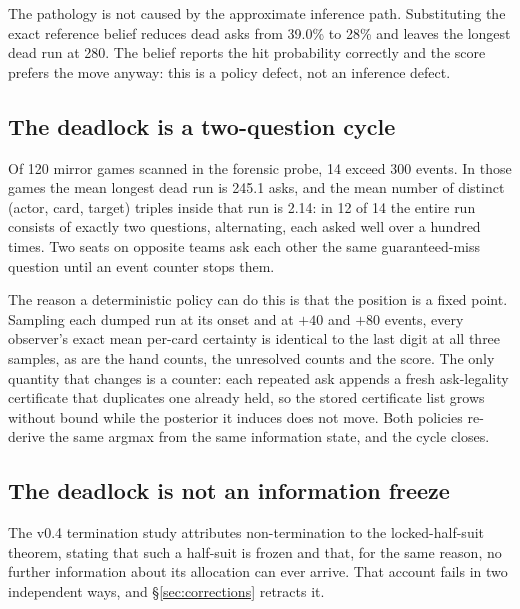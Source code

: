 \documentclass[11pt]{article}
\theoremstyle{definition}
\providecommand{\numDeadAsk}{39.0}
\providecommand{\numBlockDeadAsk}{28}
\providecommand{\numBlockDeadRun}{280}
\providecommand{\numScanGames}{120}
\providecommand{\numLongGames}{14}
\providecommand{\numCycleLen}{245.1}
\providecommand{\numCycleTriples}{2.14}
\providecommand{\numPureCycle}{12}
\begin{document}
The pathology is not caused by the approximate inference path. Substituting the
exact reference belief reduces dead asks from \numDeadAsk\% to
\numBlockDeadAsk\% and leaves the longest dead run at \numBlockDeadRun{}. The
belief reports the hit probability correctly and the score prefers the move
anyway: this is a policy defect, not an inference defect.

\subsection{The deadlock is a two-question cycle}
\label{sec:diag-cycle}

Of \numScanGames{} mirror games scanned in the forensic probe, \numLongGames{}
exceed 300 events. In those games the mean longest dead run is \numCycleLen{}
asks, and the mean number of distinct (actor, card, target) triples inside that
run is \numCycleTriples{}: in \numPureCycle{} of \numLongGames{} the entire run
consists of exactly two questions, alternating, each asked well over a hundred
times. Two seats on opposite teams ask each other the same guaranteed-miss
question until an event counter stops them.

The reason a deterministic policy can do this is that the position is a fixed
point. Sampling each dumped run at its onset and at $+40$ and $+80$ events, every
observer's exact mean per-card certainty is identical to the last digit at all
three samples, as are the hand counts, the unresolved counts and the score. The
only quantity that changes is a counter: each repeated ask appends a fresh
ask-legality certificate that duplicates one already held, so the stored
certificate list grows without bound while the posterior it induces does not
move. Both policies re-derive the same argmax from the same information state,
and the cycle closes.

\subsection{The deadlock is not an information freeze}
\label{sec:diag-information}

The v0.4 termination study attributes non-termination to the locked-half-suit
theorem, stating that such a half-suit is frozen and that, for the same reason,
no further information about its allocation can ever arrive. That account fails
in two independent ways, and \S\ref{sec:corrections} retracts it.
\end{document}

